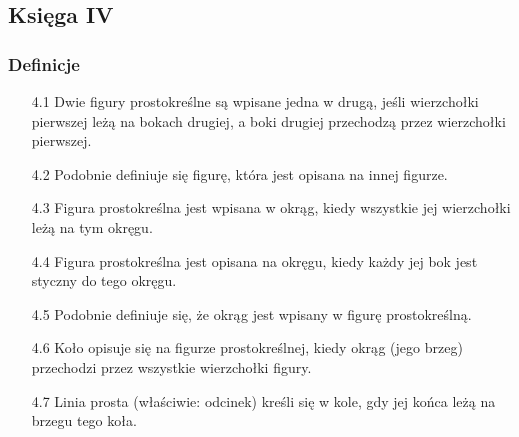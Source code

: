 %

\subsection{Księga IV}
\subsubsection{Definicje}
\begin{enumerate}
	\item [4.1] Dwie figury prostokreślne są wpisane jedna w drugą, jeśli wierzchołki pierwszej leżą na bokach drugiej, a boki drugiej przechodzą przez wierzchołki pierwszej.
	\item [4.2] Podobnie definiuje się figurę, która jest opisana na innej figurze.
	\item [4.3] Figura prostokreślna jest wpisana w okrąg, kiedy wszystkie jej wierzchołki leżą na tym okręgu.
	\item [4.4] Figura prostokreślna jest opisana na okręgu, kiedy każdy jej bok jest styczny do tego okręgu.
	\item [4.5] Podobnie definiuje się, że okrąg jest wpisany w figurę prostokreślną.
	\item [4.6] Koło opisuje się na figurze prostokreślnej, kiedy okrąg (jego brzeg) przechodzi przez wszystkie wierzchołki figury.
	\item [4.7] Linia prosta (właściwie: odcinek) kreśli się w kole, gdy jej końca leżą na brzegu tego koła.
\end{enumerate}

